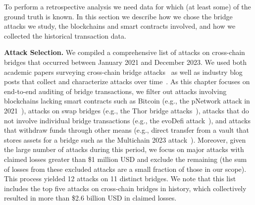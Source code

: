 
To perform a retrospective analysis we need data for which (at
least some) of the ground truth is known.   In this section we
describe how we chose the bridge attacks we study, the blockchains and
smart contracts involved, and how we collected the historical
transaction data.

\textbf{Attack Selection.}
%
We compiled a comprehensive list of attacks on cross-chain
bridges that occurred between January 2021 and December 2023.  We used both academic papers surveying cross-chain
bridge attacks~\cite{lee2023sok, zhang2023sok, zhao2023comprehensive} as well
as industry blog posts that collect and characterize attacks over time~\cite{GithubBridgeBugTracker, SlowMistHackedBridges:online,
  REKTDB:online, Web3Great:online, GithubBridgeHacks2:online}. 
As this chapter focuses on end-to-end auditing of bridge transactions, we filter out attacks
involving blockchains lacking smart contracts such
as Bitcoin (e.g., the pNetwork attack in 2021~\cite{pNetworkhack:online}), attacks on swap bridges (e.g., the Thor bridge attacks~\cite{Thorhack1:online,Thorhack2:online}), attacks that do not involve individual bridge transactions (e.g., the evoDefi attack~\cite{evoDefihack:online}),
and attacks that withdraw funds through other means (e.g., direct transfer from a vault that stores assets for a bridge such as the Multichain 2023 attack~\cite{Multichainhack:online}).  Moreover, given the large number of attacks during this period, we focus on
major attacks with claimed losses greater than \$1 million USD and
exclude the remaining (the sum of losses from these excluded attacks are a small fraction of those in our scope).
%
%
This process yielded 12 attacks on 11 distinct bridges.
We note that this list
includes the top five attacks on cross-chain bridges in history, which
collectively resulted in more than \$2.6 billion USD in claimed losses.

